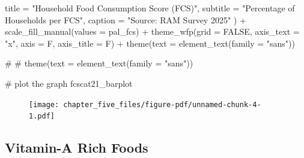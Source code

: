 \documentclass[
  letterpaper,
  DIV=11,
  numbers=noendperiod]{scrreprt}
\newenvironment{Shaded}{\begin{snugshade}}{\end{snugshade}}
\newcommand{\AttributeTok}[1]{\textcolor[rgb]{0.40,0.45,0.13}{#1}}
\newcommand{\CommentTok}[1]{\textcolor[rgb]{0.37,0.37,0.37}{#1}}
\newcommand{\ConstantTok}[1]{\textcolor[rgb]{0.56,0.35,0.01}{#1}}
\newcommand{\FunctionTok}[1]{\textcolor[rgb]{0.28,0.35,0.67}{#1}}
\newcommand{\NormalTok}[1]{\textcolor[rgb]{0.00,0.23,0.31}{#1}}
\newcommand{\SpecialCharTok}[1]{\textcolor[rgb]{0.37,0.37,0.37}{#1}}
\newcommand{\StringTok}[1]{\textcolor[rgb]{0.13,0.47,0.30}{#1}}
\begin{document}
\begin{Shaded}
\begin{Highlighting}[]
       \AttributeTok{title =} \StringTok{"Household Food Consumption Score (FCS)"}\NormalTok{,}
       \AttributeTok{subtitle =} \StringTok{"Percentage of Households per FCS"}\NormalTok{,}
       \AttributeTok{caption =} \StringTok{"Source: RAM Survey 2025"}
\NormalTok{  ) }\SpecialCharTok{+}  \FunctionTok{scale\_fill\_manual}\NormalTok{(}\AttributeTok{values =}\NormalTok{ pal\_fcs) }\SpecialCharTok{+} \FunctionTok{theme\_wfp}\NormalTok{(}\AttributeTok{grid =} \ConstantTok{FALSE}\NormalTok{, }\AttributeTok{axis\_text =} \StringTok{"x"}\NormalTok{, }\AttributeTok{axis =}\NormalTok{ F, }\AttributeTok{axis\_title =}\NormalTok{ F) }\SpecialCharTok{+} \FunctionTok{theme}\NormalTok{(}\AttributeTok{text =} \FunctionTok{element\_text}\NormalTok{(}\AttributeTok{family =} \StringTok{"sans"}\NormalTok{))}


\CommentTok{\# }
\CommentTok{\# theme(text = element\_text(family = "sans"))}

\CommentTok{\# plot the graph }
\NormalTok{fcscat21\_barplot}
\end{Highlighting}
\end{Shaded}

\begin{figure}[H]

{\centering \texttt{[image: chapter\_five\_files/figure-pdf/unnamed-chunk-4-1.pdf]}

}

\end{figure}

\hypertarget{vitamin-a-rich-foods}{%
\subsection{Vitamin-A Rich Foods}\label{vitamin-a-rich-foods}}
\end{document}
